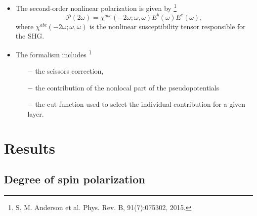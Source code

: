 \documentclass{beamer}
\begin{document}
\begin{frame}


{\small

\begin{itemize}

\item 
The second-order nonlinear polarization is given by
\footnote[frame]{\tiny S. M. Anderson et al. Phys. Rev. B, 91(7):075302, 2015.}
\begin{equation*}\label{eq:pol}
\mathcal{P}(2\omega) = 
\chi^{abc}(-2\omega;\omega,\omega)E^{b}(\omega)E^{c}(\omega),
\end{equation*} 
where $\chi^{abc}(-2\omega;\omega,\omega)$ is the nonlinear susceptibility
tensor responsible for the SHG.

\item 
The formalism includes\textsuperscript{ 1}
\begin{itemize}
\item [$-$] the scissors correction,
\item [$-$] the contribution of the nonlocal part of the pseudopotentials
\item [$-$] the cut function used to select the individual contribution for
a given layer.
\end{itemize}

\end{itemize}
}
\end{frame}





\section{Results}



\subsection{Degree of spin polarization}


\end{document}

